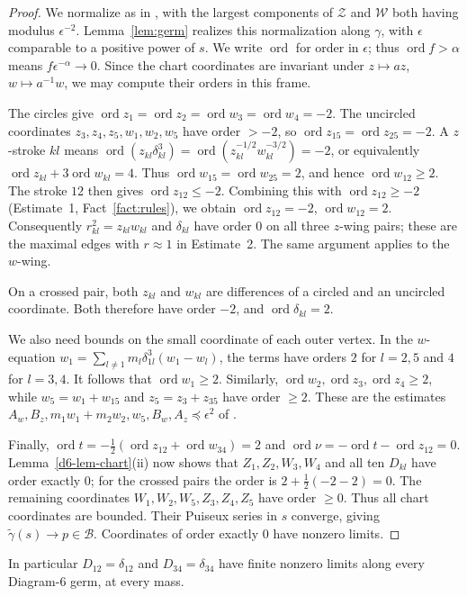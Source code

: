 \documentclass[11pt]{amsart}
\theoremstyle{definition}
\theoremstyle{remark}
\newcommand{\ord}{\operatorname{ord}}
\begin{document}
\begin{proof}
{
We normalize as in \cite[p.~547]{AK}, with the largest components of
$\mathcal Z$ and $\mathcal W$ both having modulus $\epsilon^{-2}$.
Lemma~\ref{lem:germ} realizes this normalization along $\gamma$, with
$\epsilon$ comparable to a positive power of $s$.  We write $\ord$ for order
in $\epsilon$; thus $\ord f>\alpha$ means $f\epsilon^{-\alpha}\to0$.
Since the chart coordinates are invariant under $z\mapsto az$, $w\mapsto a^{-1}w$,
we may compute their orders in this frame.
}

{
The circles give $\ord z_1=\ord z_2=\ord w_3=\ord w_4=-2$.
The uncircled coordinates $z_3,z_4,z_5,w_1,w_2,w_5$ have order $>-2$,
so $\ord z_{15}=\ord z_{25}=-2$.  A $z$-stroke $kl$ means
$\ord(z_{kl}\delta_{kl}^3)=\ord(z_{kl}^{-1/2}w_{kl}^{-3/2})=-2$, or equivalently
$\ord z_{kl}+3\ord w_{kl}=4$.  Thus $\ord w_{15}=\ord w_{25}=2$, and hence
$\ord w_{12}\ge2$.  The stroke $12$ then gives $\ord z_{12}\le-2$.
Combining this with $\ord z_{12}\ge-2$ (Estimate~1, Fact~\ref{fact:rules}),
we obtain $\ord z_{12}=-2$, $\ord w_{12}=2$.
Consequently $r_{kl}^2=z_{kl}w_{kl}$ and $\delta_{kl}$ have order $0$ on
all three $z$-wing pairs; these are the maximal edges with $r\approx1$ in
Estimate~2.  The same argument applies to the $w$-wing.

On a crossed pair, both $z_{kl}$ and $w_{kl}$ are differences of a circled
and an uncircled coordinate.  Both therefore have order $-2$, and
$\ord\delta_{kl}=2$.

We also need bounds on the small coordinate of each outer vertex.
In the $w$-equation $w_1=\sum_{l\ne1}m_l\delta_{1l}^3(w_1-w_l)$,
the terms have orders $2$ for $l=2,5$ and $4$ for $l=3,4$.
It follows that $\ord w_1\ge2$.  Similarly,
$\ord w_2,\ord z_3,\ord z_4\ge2$, while
$w_5=w_1+w_{15}$ and $z_5=z_3+z_{35}$ have order $\ge2$.
These are the estimates $A_w,B_z,m_1w_1+m_2w_2,w_5,B_w,A_z\preccurlyeq\epsilon^2$
of \cite[\S8.6]{AK}.

Finally, $\ord t=-\frac12(\ord z_{12}+\ord w_{34})=2$ and
$\ord\nu=-\ord t-\ord z_{12}=0$.
Lemma~\ref{d6-lem-chart}(ii) now shows that $Z_1,Z_2,W_3,W_4$ and all ten
$D_{kl}$ have order exactly $0$; for the crossed pairs the order is
$2+\frac12(-2-2)=0$.  The remaining coordinates
$W_1,W_2,W_5,Z_3,Z_4,Z_5$ have order $\ge0$.
Thus all chart coordinates are bounded.  Their Puiseux series in $s$
converge, giving $\tilde\gamma(s)\to p\in\mathcal B$.
Coordinates of order exactly $0$ have nonzero limits.
}
\end{proof}
In particular $D_{12}=\delta_{12}$ and $D_{34}=\delta_{34}$ have finite nonzero limits along every
Diagram-6 germ, at every mass.
\end{document}
